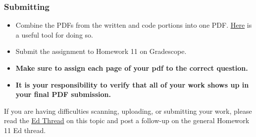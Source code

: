 \documentclass[11pt]{article}
\providecommand{\tightlist}{%
      \setlength{\itemsep}{0pt}\setlength{\parskip}{0pt}}
\begin{document}
\hypertarget{submitting}{%
\subsubsection{Submitting}\label{submitting}}

\begin{itemize}
\tightlist
\item
  Combine the PDFs from the written and code portions into one PDF.
  \href{https://smallpdf.com/merge-pdf}{Here} is a useful tool for doing
  so.
\item
  Submit the assignment to Homework 11 on Gradescope.
\item
  \textbf{Make sure to assign each page of your pdf to the correct
  question.}
\item
  \textbf{It is your responsibility to verify that all of your work
  shows up in your final PDF submission.}
\end{itemize}

If you are having difficulties scanning, uploading, or submitting your
work, please read the
\href{https://edstem.org/us/courses/94054/discussion/7533569}{Ed Thread}
on this topic and post a follow-up on the general Homework 11 Ed thread.


    
    
    
\end{document}
